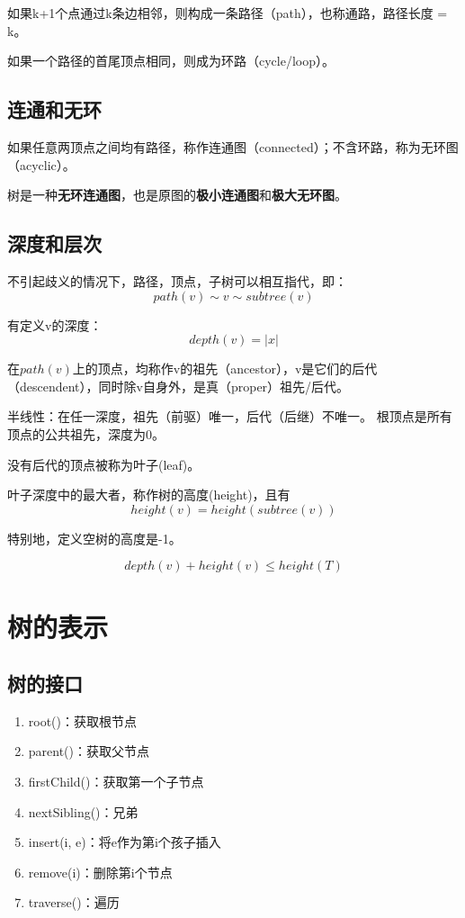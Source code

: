 \documentclass{article}
\begin{document}
如果k+1个点通过k条边相邻，则构成一条路径（path），也称通路，路径长度 = k。

如果一个路径的首尾顶点相同，则成为环路（cycle/loop）。

\subsection{连通和无环}

如果任意两顶点之间均有路径，称作连通图（connected）；不含环路，称为无环图（acyclic）。

树是一种\textbf{无环连通图}，也是原图的\textbf{极小连通图}和\textbf{极大无环图}。

\subsection{深度和层次}

不引起歧义的情况下，路径，顶点，子树可以相互指代，即：
$$path(v) \sim v \sim subtree(v)$$

有定义v的深度：
$$depth(v) = \left|x\right|$$

在$path(v)$上的顶点，均称作v的祖先（ancestor），v是它们的后代（descendent），同时除v自身外，是真（proper）祖先/后代。

半线性：在任一深度，祖先（前驱）唯一，后代（后继）不唯一。
根顶点是所有顶点的公共祖先，深度为0。

没有后代的顶点被称为叶子(leaf)。

叶子深度中的最大者，称作树的高度(height)，且有
$$height(v) = height(subtree(v))$$

特别地，定义空树的高度是-1。

$$depth(v) + height(v) \leq height(T)$$

\section{树的表示}
\subsection{树的接口}
\begin{enumerate}
  \item root()：获取根节点
  \item parent()：获取父节点
  \item firstChild()：获取第一个子节点
  \item nextSibling()：兄弟
  \item insert(i, e)：将e作为第i个孩子插入
  \item remove(i)：删除第i个节点
  \item traverse()：遍历
\end{enumerate}
\end{document}
